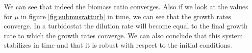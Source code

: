 \documentclass[10pt]{report}
\begin{document}
We can see that indeed the biomass ratio converges. Also if we look at the values for $\mu$ in figure \ref{fig:submusratturb} in time, we can see that the growth rates converge. In a turbidostat the dilution rate will become equal to the final growth rate to which the growth rates converge. We can also conclude that this system stabilizes in time and that it is robust with respect to the initial conditions. 





%
%



\begin{abstract}
  
\end{abstract}
\end{document}
